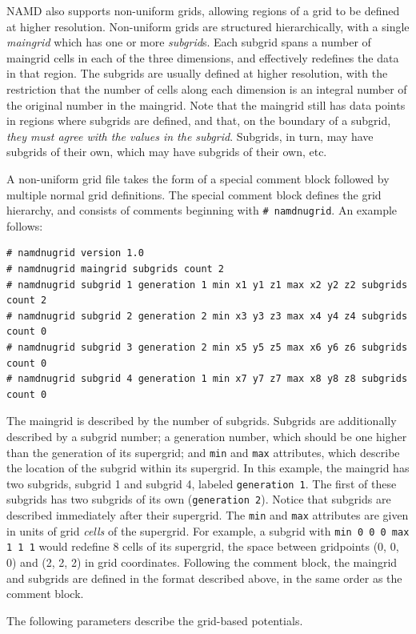 NAMD also supports non-uniform grids, allowing regions of a grid to be defined at higher resolution.
Non-uniform grids are structured hierarchically, with a single \emph{maingrid} which has one or more \emph{subgrid}s.
Each subgrid spans a number of maingrid cells in each of the three dimensions, and effectively redefines the data in that region.
The subgrids are usually defined at higher resolution, with the restriction that the number of cells along each dimension is an integral number of the original number in the maingrid.
Note that the maingrid still has data points in regions where subgrids are defined, and that, on the boundary of a subgrid, \emph{they must agree with the values in the subgrid}.
Subgrids, in turn, may have subgrids of their own, which may have subgrids of their own, etc.

A non-uniform grid file takes the form of a special comment block followed by multiple normal grid definitions.
The special comment block defines the grid hierarchy, and consists of comments beginning with {\tt \# namdnugrid}.
An example follows:
\begin{verbatim}
# namdnugrid version 1.0
# namdnugrid maingrid subgrids count 2
# namdnugrid subgrid 1 generation 1 min x1 y1 z1 max x2 y2 z2 subgrids count 2
# namdnugrid subgrid 2 generation 2 min x3 y3 z3 max x4 y4 z4 subgrids count 0
# namdnugrid subgrid 3 generation 2 min x5 y5 z5 max x6 y6 z6 subgrids count 0
# namdnugrid subgrid 4 generation 1 min x7 y7 z7 max x8 y8 z8 subgrids count 0
\end{verbatim}
The maingrid is described by the number of subgrids.
Subgrids are additionally described by a subgrid number; a generation number, which should be one higher than the generation of its supergrid; and {\tt min} and {\tt max} attributes, which describe the location of the subgrid within its supergrid.
In this example, the maingrid has two subgrids, subgrid 1 and subgrid 4, labeled {\tt generation 1}.
The first of these subgrids has two subgrids of its own ({\tt generation 2}).
Notice that subgrids are described immediately after their supergrid.
The {\tt min} and {\tt max} attributes are given in units of grid \emph{cells} of the supergrid.
For example, a subgrid with {\tt min 0 0 0 max 1 1 1} would redefine 8 cells of its supergrid, the space between gridpoints (0, 0, 0) and (2, 2, 2) in grid coordinates.
Following the comment block, the maingrid and subgrids are defined in the format described above, in the same order as the comment block.


The following parameters describe the grid-based potentials.

